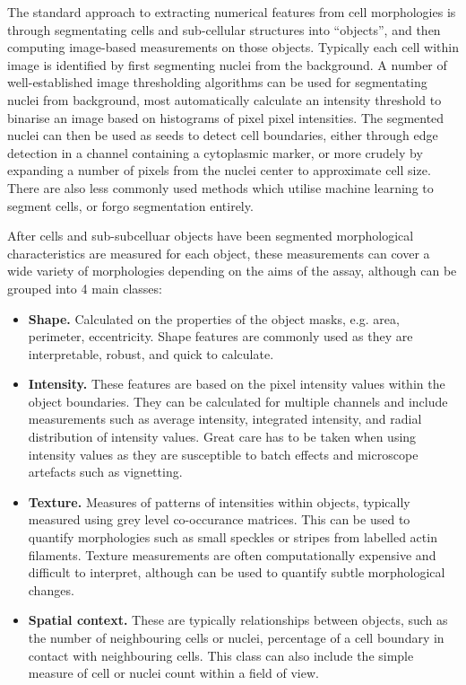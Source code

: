 \documentclass[a4paper,11pt,twoside,openright]{scrbook}
\begin{document}
The standard approach to extracting numerical features from cell morphologies is through segmentating cells and sub-cellular structures into ``objects'', and then computing image-based measurements on those objects.
Typically each cell within image is identified by first segmenting nuclei from the background.
A number of well-established image thresholding algorithms can be used for segmentating nuclei from background, most automatically calculate an intensity threshold to binarise an image based on histograms of pixel pixel intensities.\cite{Otsu1979,Padmanabhan2010}
The segmented nuclei can then be used as seeds to detect cell boundaries, either through edge detection in a channel containing a cytoplasmic marker, or more crudely by expanding a number of pixels from the nuclei center to approximate cell size.
There are also less commonly used methods which utilise machine learning to segment cells, \cite{Sommer2011} or forgo segmentation entirely. \cite{Rajaram2012,Orlov2008}

After cells and sub-subcelluar objects have been segmented morphological characteristics are measured for each object, these measurements can cover a wide variety of morphologies depending on the aims of the assay, although can be grouped into 4 main classes:

\begin{itemize}
    \item \textbf{Shape.} Calculated on the properties of the object masks, e.g. area, perimeter, eccentricity. Shape features are commonly used as they are interpretable, robust, and quick to calculate.
    \item \textbf{Intensity.} These features are based on the pixel intensity values within the object boundaries.
They can be calculated for multiple channels and include measurements such as average intensity, integrated intensity, and radial distribution of intensity values.
Great care has to be taken when using intensity values as they are susceptible to batch effects and microscope artefacts such as vignetting. \cite{Goldman2010}
    \item \textbf{Texture.} Measures of patterns of intensities within objects, typically measured using grey level co-occurance matrices. \cite{Haralick1973} 
This can be used to quantify morphologies such as small speckles or stripes from labelled actin filaments.
Texture measurements are often computationally expensive and difficult to interpret, although can be used to quantify subtle morphological changes.
    \item \textbf{Spatial context.} These are typically relationships between objects, such as the number of neighbouring cells or nuclei, percentage of a cell boundary in contact with neighbouring cells. This class can also include the simple measure of cell or nuclei count within a field of view.
\end{itemize}
\end{document}

